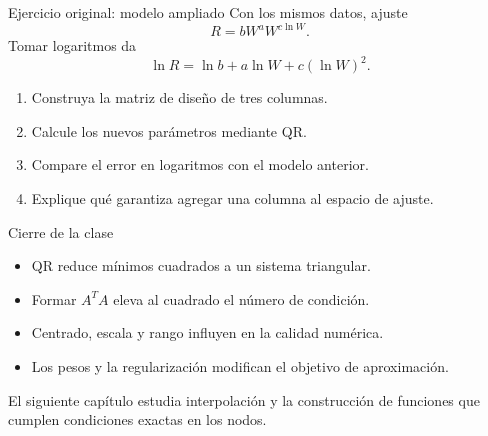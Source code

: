 \documentclass[aspectratio=169,12pt]{beamer}
\begin{document}
\begin{frame}{Ejercicio original: modelo ampliado}
Con los mismos datos, ajuste
\[
R=bW^aW^{c\ln W}.
\]
Tomar logaritmos da
\[
\ln R=\ln b+a\ln W+c(\ln W)^2.
\]
\begin{enumerate}
\item Construya la matriz de diseño de tres columnas.
\item Calcule los nuevos parámetros mediante QR.
\item Compare el error en logaritmos con el modelo anterior.
\item Explique qué garantiza agregar una columna al espacio de ajuste.
\end{enumerate}
\end{frame}

\begin{frame}{Cierre de la clase}
\begin{itemize}
\item QR reduce mínimos cuadrados a un sistema triangular.
\item Formar $A^TA$ eleva al cuadrado el número de condición.
\item Centrado, escala y rango influyen en la calidad numérica.
\item Los pesos y la regularización modifican el objetivo de aproximación.
\end{itemize}
\vspace{.4cm}
El siguiente capítulo estudia interpolación y la construcción de funciones
que cumplen condiciones exactas en los nodos.
\end{frame}
\end{document}
